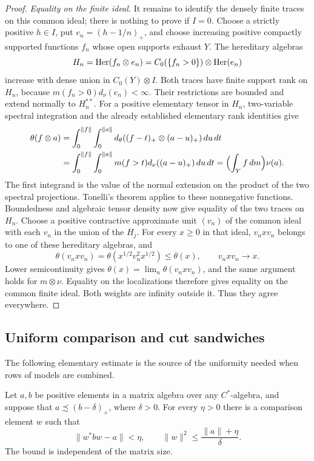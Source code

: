 \begin{proof}
\emph{Equality on the finite ideal.}
It remains to identify the densely finite traces on this common
ideal; there is nothing to prove if \(I=0\).
Choose a strictly positive \(h\in I\), put \(e_n=(h-1/n)_+\),
and choose increasing positive compactly supported functions
\(f_n\) whose open supports exhaust \(Y\). The hereditary algebras
\[
 H_n=\operatorname{Her}(f_n\otimes e_n)
     =C_0(\{f_n>0\})\otimes\operatorname{Her}(e_n)
\]
increase with dense union in \(C_0(Y)\otimes I\).
Both traces have finite support rank on \(H_n\), because
\(m(f_n>0)d_\nu(e_n)<\infty\). Their restrictions are bounded
and extend normally to \(H_n^{**}\).
For a positive elementary tensor in \(H_n\), two-variable spectral
integration and the already established elementary rank identities
give
\begin{align*}
 \theta(f\otimes a)
 &=\int_0^{\|f\|}\int_0^{\|a\|}
   d_\theta((f-t)_+\otimes(a-u)_+)\,du\,dt\\
 &=\int_0^{\|f\|}\int_0^{\|a\|}
   m(f>t)d_\nu((a-u)_+)\,du\,dt
 =\Bigl(\int_Y f\,dm\Bigr)\nu(a).
\end{align*}
The first integrand is the value of the normal extension on the
product of the two spectral projections. Tonelli's theorem applies
to these nonnegative functions. Boundedness and algebraic tensor
density now give equality of the two traces on \(H_n\).
Choose a positive contractive approximate unit \((v_n)\) of the
common ideal with each \(v_n\) in the union of the \(H_j\).
For every \(x\geq0\) in that ideal, \(v_nxv_n\) belongs to one
of these hereditary algebras, and
\[
 \theta(v_nxv_n)
 =\theta(x^{1/2}v_n^2x^{1/2})\leq\theta(x),
 \qquad v_nxv_n\longrightarrow x.
\]
Lower semicontinuity gives
\(\theta(x)=\lim_n\theta(v_nxv_n)\), and the same argument holds
for \(m\otimes\nu\). Equality on the localizations therefore
gives equality on the common finite ideal.
Both weights are infinity outside it. Thus they agree everywhere.
\end{proof}

\subsection{Uniform comparison and cut sandwiches}

The following elementary estimate is the source of the uniformity
needed when rows of models are combined.

\begin{lemma}
\label{seq:uniform-witness}
Let \(a,b\) be positive elements in a matrix algebra over any
\(C^*\)-algebra, and suppose that \(a\precsim(b-\delta)_+\),
where \(\delta>0\). For every \(\eta>0\) there is a comparison
element \(w\) such that
\begin{equation}\label{seq:witness-bound}
 \|w^*bw-a\|<\eta,
 \qquad
 \|w\|^2\leq\frac{\|a\|+\eta}{\delta}.
\end{equation}
The bound is independent of the matrix size.
\end{lemma}

